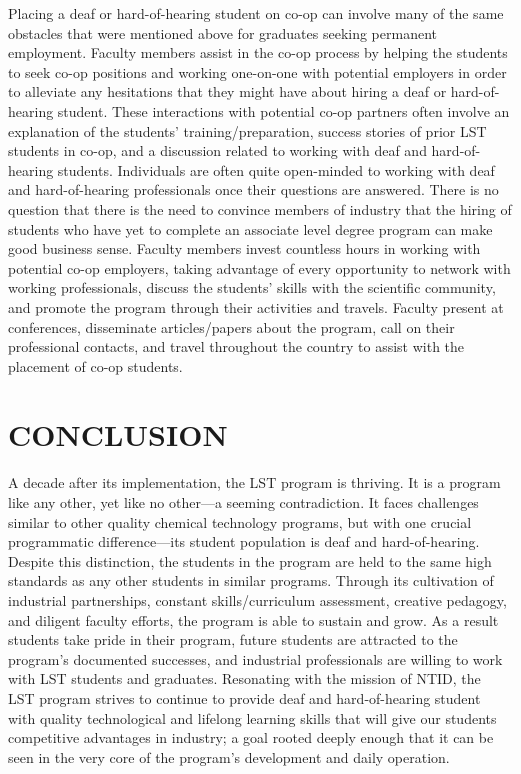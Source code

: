 \documentclass[11.5pt]{sig-alternate} %
\begin{document}
\begin{large}
\begin{enumerate}
\begin{sloppypar}
    Placing a deaf or hard-of-hearing student on co-op can involve many of the same obstacles that were mentioned above for graduates seeking permanent employment. Faculty members assist in the co-op process by helping the students to seek co-op positions and working one-on-one with potential employers in order to alleviate any hesitations that they might have about hiring a deaf or hard-of-hearing student. These interactions with potential co-op partners often involve an explanation of the students’ training/preparation, success stories of prior LST students in co-op, and a discussion related to working with deaf and hard-of-hearing students. Individuals are often quite open-minded to working with deaf and hard-of-hearing professionals once their questions are answered. There is no question that there is the need to convince members of industry that the hiring of students who have yet to complete an associate level degree program can make good business sense. Faculty members invest countless hours in working with potential co-op employers, taking advantage of every opportunity to network with working professionals, discuss the students’ skills with the scientific community, and promote the program through their activities and travels. Faculty present at conferences, disseminate articles/papers about the program, call on their professional contacts, and travel throughout the country to assist with the placement of co-op students.\end{sloppypar}
\end{enumerate}

\section*{CONCLUSION}
A decade after its implementation, the LST program is thriving. It is a program like any other, yet like no other—a seeming contradiction. It faces challenges similar to other quality chemical technology programs, but with one crucial programmatic difference—its student population is deaf and hard-of-hearing. Despite this distinction, the students in the program are held to the same high standards as any other students in similar programs. Through its cultivation of industrial partnerships, constant skills/curriculum assessment, creative pedagogy, and diligent faculty efforts, the program is able to sustain and grow. As a result students take pride in their program, future students are attracted to the program’s documented successes, and industrial professionals are willing to work with LST students and graduates. Resonating with the mission of NTID, the LST program strives to continue to provide deaf and hard-of-hearing student with quality technological and lifelong learning skills that will give our students competitive advantages in industry; a goal rooted deeply enough that it can be seen in the very core of the program’s development and daily operation.

\end{large}
\clearpage
\end{document}
